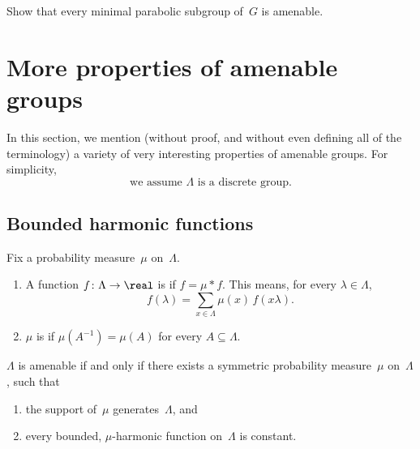 \begin{exercises}

\item \label{MinParabIsAmen}
Show that every minimal parabolic subgroup of~$G$ is amenable.

\end{exercises}











\section{More properties of amenable groups \texorpdfstring{\optional}{(optional)}}

In this section, we mention (without proof, and without even defining all of the terminology) a variety of very interesting properties of amenable groups. For simplicity, 
	$$ \text{we assume $\Lambda$ is a discrete group.} $$





\subsection{Bounded harmonic functions}

\begin{defn} 
Fix a probability measure~$\mu$ on~$\Lambda$.	
	\begin{enumerate}
	\item A function $f \colon \Lambda \to \real$ is  if $f = \mu *f$. This means, for every $\lambda \in \Lambda$, 
	$$ f(\lambda) = \sum_{x \in \Lambda} \mu(x) \, f( x \lambda )  .$$
	\item $\mu$ is  if $\mu(A^{-1}) = \mu(A)$ for every $A \subseteq \Lambda$.
	\end{enumerate}
\end{defn}

\begin{thm} \label{AmenNoBddHarm}
$\Lambda$ is amenable if and only if there exists a symmetric probability measure~$\mu$ on~$\Lambda$, such that 
\noprelistbreak
	\begin{enumerate}
	\item the support of~$\mu$ generates~$\Lambda$,
	and
	\item every bounded, $\mu$-harmonic function on~$\Lambda$ is constant.
	\end{enumerate}
\end{thm}

